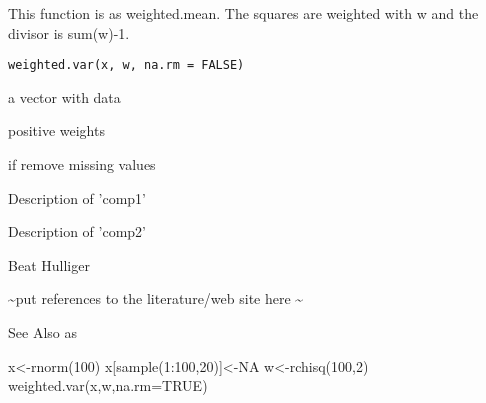 %
\begin{Description}\relax
This function is as weighted.mean. The squares are weighted with w and the divisor is sum(w)-1. 
\end{Description}
%
\begin{Usage}
\begin{verbatim}
weighted.var(x, w, na.rm = FALSE)
\end{verbatim}
\end{Usage}
%
\begin{Arguments}
\begin{ldescription}
\item[\code{x}] a vector with data
\item[\code{w}] positive weights
\item[\code{na.rm}] if  remove missing values
\end{ldescription}
\end{Arguments}
%
\begin{Value}
\begin{ldescription}
\item[\code{comp1 }] Description of 'comp1'
\item[\code{comp2 }] Description of 'comp2'
\end{ldescription}
\end{Value}
%
\begin{Author}\relax
Beat Hulliger
\end{Author}
%
\begin{References}\relax
 \textasciitilde{}put references to the literature/web site here \textasciitilde{} 
\end{References}
%
\begin{SeeAlso}\relax
See Also as 
\end{SeeAlso}
%
\begin{Examples}
\begin{ExampleCode}
x<-rnorm(100)
x[sample(1:100,20)]<-NA
w<-rchisq(100,2)
weighted.var(x,w,na.rm=TRUE)
\end{ExampleCode}
\end{Examples}
